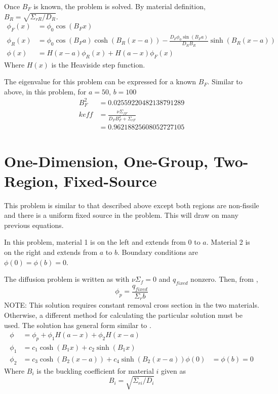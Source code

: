   Once $B_F$ is known, the problem is solved. By material definition, 
  ${B_R = \sqrt{\Sigma_{rR}/D_R}}$.
  \begin{align}
    \phi_F(x) &= \phi_0 \cos(B_F x)\\
    \phi_R(x) &= \phi_0 \cos(B_F a) \cosh(B_R (x-a)) 
      - \frac{D_F \phi_0 \sin(B_F a)}{D_R B_R} \sinh(B_R (x-a))\\
    \phi(x) &= H(x-a)\phi_R(x) + H(a-x)\phi_F(x)
  \end{align}
  Where $H(x)$ is the Heaviside step function.  
  
  The eigenvalue for this problem can be expressed for a known $B_F$. Similar 
  to  above, in this problem, for $a=50$, $b=100$
  \begin{align}
    B_F^2  &= 0.02559220482138791289 \\
    keff &= \frac{\nu\Sigma_{fF}}{D_F B_F^2 + \Sigma_{rF}} \\
    &= 0.96218825608052727105
  \end{align}
  
\section{One-Dimension, One-Group, Two-Region, Fixed-Source}
  This problem is similar to that described above except both regions are 
  non-fissile and there is a uniform fixed source in the problem. This will 
  draw on many previous equations.
  
  In this problem, material 1 is on the left and extends from 0 to $a$. 
  Material 2 is on the right and extends from $a$ to $b$. Boundary conditions 
  are $\phi(0)=\phi(b)=0$.
  
  The diffusion problem is written as  with 
  $\nu \Sigma_f =0$ and $q_{fixed}$ nonzero. Then, from ,
  \begin{equation}
  	\phi_p = \frac{q_{fixed}}{\Sigma_r b}
  \end{equation}
  NOTE: This solution requires constant removal cross section in the two 
  materials. Otherwise, a different method for calculating the particular 
  solution must be used. The solution has general form similar to
  .
  \begin{align}
  	\phi &= \phi_p + \phi_1 H(a-x) + \phi_2 H(x-a) \\
    \phi_1 &= c_1 \cosh(B_1 x) + c_2 \sinh(B_1 x) \\
    \phi_2 &= c_3 \cosh(B_2 (x-a)) + c_4 \sinh(B_2 (x-a))
    \phi(0)&=\phi(b)=0
  \end{align}
  Where $B_i$ is the buckling coefficient for material $i$ given as
  \begin{equation}
    B_i = \sqrt{\Sigma_{ri} / D_i}
  \end{equation}
  
